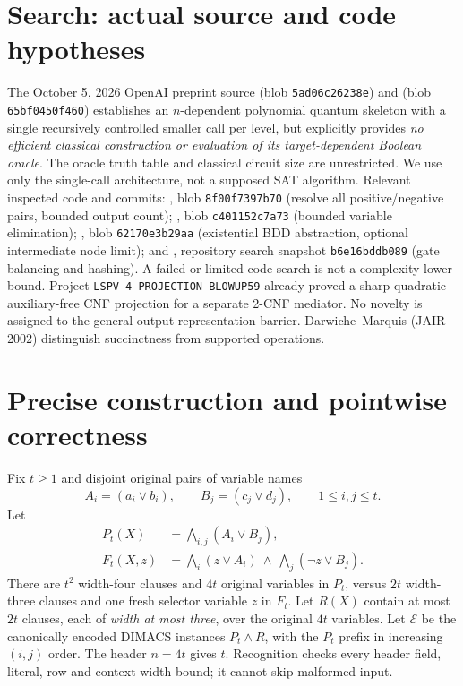 \documentclass[11pt]{article}
\begin{document}
\section{Search: actual source and code hypotheses}
The October 5, 2026 OpenAI preprint source
(blob \texttt{5ad06c26238e}) and 
(blob \texttt{65bf0450f460}) establishes an $n$-dependent polynomial
quantum skeleton with a single recursively controlled smaller call per
level, but explicitly provides \emph{no efficient classical construction
or evaluation of its target-dependent Boolean oracle}. The oracle
truth table and classical circuit size are unrestricted. We use only
the single-call architecture, not a supposed SAT algorithm.
Relevant inspected code and commits:
, blob
\texttt{8f00f7397b70} (resolve all positive/negative pairs, bounded
output count); , blob
\texttt{c401152c7a73} (bounded variable elimination);
, blob
\texttt{62170e3b29aa} (existential BDD abstraction, optional intermediate
node limit);  and
, repository search snapshot
\texttt{b6e16bddb089} (gate balancing and hashing).
A failed or limited code search is not a complexity lower bound.
Project \texttt{LSPV-4 PROJECTION-BLOWUP59} already proved a sharp
quadratic auxiliary-free CNF projection for a separate 2-CNF mediator.
No novelty is assigned to the general output representation barrier.
Darwiche--Marquis (JAIR 2002) distinguish succinctness from
supported operations.

\section{Precise construction and pointwise correctness}
Fix $t\ge1$ and disjoint original pairs of variable names
\[
 A_i=(a_i\vee b_i),\qquad B_j=(c_j\vee d_j),\qquad 1\le i,j\le t.
\]
Let
\begin{align}
 P_t(X)&=\bigwedge_{i,j}(A_i\vee B_j),\\
 F_t(X,z)&=\bigwedge_i(z\vee A_i)\ \wedge\
                         \bigwedge_j(\neg z\vee B_j).
\end{align}
There are $t^2$ width-four clauses and $4t$ original variables
in $P_t$, versus $2t$ width-three clauses and one fresh selector
variable $z$ in $F_t$. Let $R(X)$ contain at most $2t$ clauses,
each of \emph{width at most three}, over the original $4t$ variables.
Let $\mathcal E$ be the canonically encoded DIMACS instances
$P_t\wedge R$, with the $P_t$ prefix in increasing $(i,j)$ order.
The header $n=4t$ gives $t$. Recognition checks every header field,
literal, row and context-width bound; it cannot skip malformed input.
\end{document}
